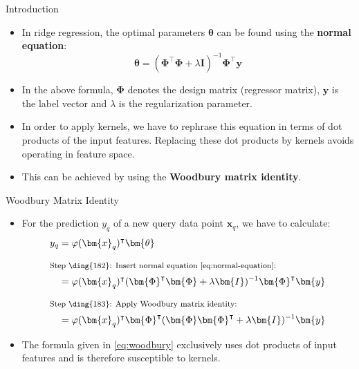 
\begin{dwHeaderFrame}{Introduction}
	\begin{itemize}
		\item In ridge regression, the optimal parameters $\bm{\theta}$ can be found using the \textbf{normal equation}:
		\begin{equation}
			\bm{\theta} = (\bm{\Phi}^{\intercal} \bm{\Phi} + \lambda \bm{I})^{-1} \bm{\Phi}^{\intercal} \bm{y}
			\label{eq:normal-equation}
		\end{equation}
		\item In the above formula, $\bm{\Phi}$ denotes the design matrix (regressor matrix), $\bm{y}$ is the label vector and $\lambda$ is the regularization parameter.
		\item In order to apply kernels, we have to rephrase this equation in terms of dot products of the input features. Replacing these dot products by kernels avoids operating in feature space.
		\item This can be achieved by using the \textbf{Woodbury matrix identity}.
	\end{itemize}
\end{dwHeaderFrame}


\begin{dwHeaderFrame}{Woodbury Matrix Identity}
	\begin{itemize}
		\item For the prediction $y_q$ of a new query data point $\bm{x}_q$, we have to calculate:
		\begin{align}
			y_q
				&= \varphi(\bm{x}_q)^{\intercal} \bm{\theta} \\[2mm]
			\shortintertext{\footnotesize Step \ding{182}: Insert normal equation \cref{eq:normal-equation}:}
				&= \varphi(\bm{x}_q)^{\intercal} (\bm{\Phi}^{\intercal} \bm{\Phi} + \lambda \bm{I})^{-1} \bm{\Phi}^{\intercal} \bm{y} \\[2mm]
			\shortintertext{\footnotesize Step \ding{183}: Apply Woodbury matrix identity:}
				&= \varphi(\bm{x}_q)^{\intercal} \bm{\Phi}^{\intercal}(\bm{\Phi} \bm{\Phi}^{\intercal} + \lambda \bm{I})^{-1} \bm{y}
			\label{eq:woodbury}
		\end{align}
		\item The formula given in \cref{eq:woodbury} exclusively uses dot products of input features and is therefore susceptible to kernels.
	\end{itemize}
\end{dwHeaderFrame}



